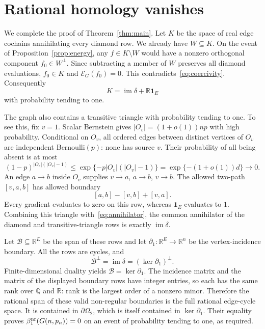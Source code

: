 \documentclass[11pt]{article}
\theoremstyle{remark}
\newcommand{\R}{\mathbb R}
\newcommand{\Q}{\mathbb Q}
\newcommand{\one}{\mathbf 1}
\newcommand{\im}{\operatorname{im}}
\begin{document}
\section[Rational homology vanishes]{\hspace{0.6em}Rational homology vanishes}

We complete the proof of Theorem~\ref{thm:main}.
Let $K$ be the space of real edge cochains annihilating every diamond
row. We already have $W\subseteq K$. On the event of
Proposition~\ref{prop:energy}, any $f\in K\setminus W$ would have a
nonzero orthogonal component $f_0\in W^\perp$. Since subtracting a
member of $W$ preserves all diamond evaluations, $f_0\in K$ and
$\mathcal E_G(f_0)=0$. This contradicts~\eqref{eq:coercivity}.
Consequently
\begin{equation}\label{eq:annihilator}
 K=\im\delta+\R\one_E
\end{equation}
with probability tending to one.

The graph also contains a transitive triangle with probability tending
to one. To see this, fix $v=1$. Scalar Bernstein gives
$|O_v|=(1+o(1))np$ with high probability. Conditional on $O_v$, all
ordered edges between distinct vertices of $O_v$ are independent
Bernoulli$(p)$: none has source $v$. Their probability of all being absent
is at most
\[
 (1-p)^{|O_v|(|O_v|-1)}
 \leq \exp\{-p|O_v|(|O_v|-1)\}
 =\exp\{-(1+o(1))d\}\longrightarrow0.
\]
An edge $a\to b$ inside $O_v$ supplies $v\to a$, $a\to b$, $v\to b$.
The allowed two-path $[v,a,b]$ has allowed boundary
\[
 [a,b]-[v,b]+[v,a].
\]
Every gradient evaluates to zero on this row, whereas $\one_E$ evaluates
to $1$. Combining this triangle with~\eqref{eq:annihilator}, the common
annihilator of the diamond and transitive-triangle rows is exactly
$\im\delta$.

Let $\mathcal B\subseteq\R^E$ be the span of these rows and let
$\partial_1:\R^E\to\R^n$ be the vertex-incidence boundary.
All the rows are cycles, and
\[
 \mathcal B^\perp=\im\delta=(\ker\partial_1)^\perp.
\]
Finite-dimensional duality yields $\mathcal B=\ker\partial_1$.
The incidence matrix and the matrix of the displayed boundary rows have
integer entries, so each has the same rank over $\Q$ and $\R$:
rank is the largest order of a nonzero minor. Therefore the rational span
of these valid non-regular boundaries is the full rational edge-cycle
space. It is contained in $\partial\Omega_2$, which is itself contained
in $\ker\partial_1$. Their equality proves
$\beta_1^{\rm nr}(G(n,p_n))=0$ on an event of probability tending to one,
as required.
\end{document}
